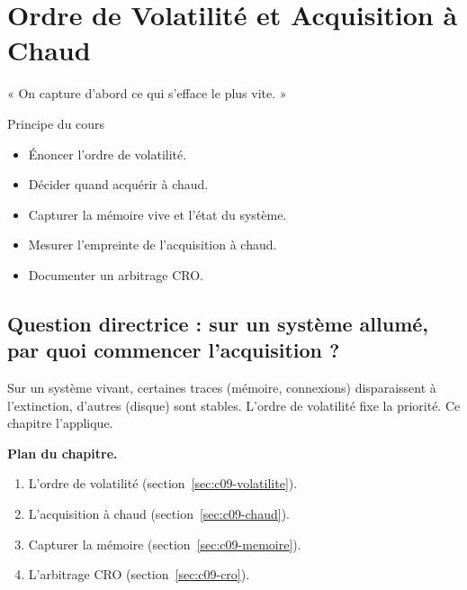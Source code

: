 
\chapter{Ordre de Volatilité et Acquisition à Chaud}
\label{chap:acquisition}

\epigraph{%
    « On capture d'abord ce qui s'efface le plus vite. »%
}{Principe du cours}


\begin{boxobjectifs}
\begin{itemize}
    \item Énoncer l'ordre de volatilité.
    \item Décider quand acquérir à chaud.
    \item Capturer la mémoire vive et l'état du système.
    \item Mesurer l'empreinte de l'acquisition à chaud.
    \item Documenter un arbitrage CRO.
\end{itemize}
\end{boxobjectifs}

\bigskip

\section*{Question directrice : sur un système allumé, par quoi commencer l'acquisition ?}

Sur un système vivant, certaines traces (mémoire, connexions) disparaissent à
l'extinction, d'autres (disque) sont stables. L'ordre de volatilité fixe la
priorité. Ce chapitre l'applique.

\medskip
\textbf{Plan du chapitre.}
\begin{enumerate}
    \item L'ordre de volatilité (section~\ref{sec:c09-volatilite}).
    \item L'acquisition à chaud (section~\ref{sec:c09-chaud}).
    \item Capturer la mémoire (section~\ref{sec:c09-memoire}).
    \item L'arbitrage CRO (section~\ref{sec:c09-cro}).
\end{enumerate}

